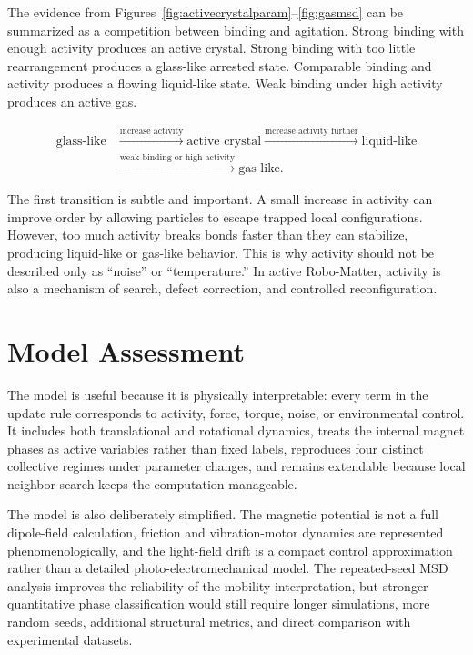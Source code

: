 \documentclass[12pt,a4paper,oneside]{report}
\begin{document}
The evidence from Figures~\ref{fig:activecrystalparam}--\ref{fig:gasmsd} can be summarized as a competition between binding and agitation. Strong binding with enough activity produces an active crystal. Strong binding with too little rearrangement produces a glass-like arrested state. Comparable binding and activity produces a flowing liquid-like state. Weak binding under high activity produces an active gas.

\begin{equation}
\begin{aligned}
\text{glass-like}
&\xrightarrow{\text{increase activity}}
\text{active crystal}
\xrightarrow{\text{increase activity further}}
\text{liquid-like} \\
&\xrightarrow{\text{weak binding or high activity}}
\text{gas-like}.
\end{aligned}
\end{equation}

The first transition is subtle and important. A small increase in activity can improve order by allowing particles to escape trapped local configurations. However, too much activity breaks bonds faster than they can stabilize, producing liquid-like or gas-like behavior. This is why activity should not be described only as ``noise'' or ``temperature.'' In active Robo-Matter, activity is also a mechanism of search, defect correction, and controlled reconfiguration.

\section{Model Assessment}
The model is useful because it is physically interpretable: every term in the update rule corresponds to activity, force, torque, noise, or environmental control. It includes both translational and rotational dynamics, treats the internal magnet phases as active variables rather than fixed labels, reproduces four distinct collective regimes under parameter changes, and remains extendable because local neighbor search keeps the computation manageable.

The model is also deliberately simplified. The magnetic potential is not a full dipole-field calculation, friction and vibration-motor dynamics are represented phenomenologically, and the light-field drift is a compact control approximation rather than a detailed photo-electromechanical model. The repeated-seed MSD analysis improves the reliability of the mobility interpretation, but stronger quantitative phase classification would still require longer simulations, more random seeds, additional structural metrics, and direct comparison with experimental datasets.
\end{document}
